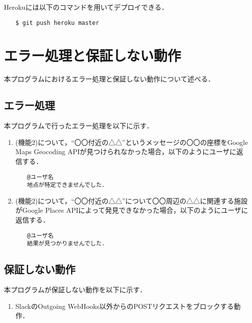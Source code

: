\documentclass[fleqn, 14pt]{extarticlej}
\begin{document}
Herokuには以下のコマンドを用いてデプロイできる．

\begin{verbatim}
　　$ git push heroku master
\end{verbatim}

\section{エラー処理と保証しない動作}
本プログラムにおけるエラー処理と保証しない動作について述べる．

\subsection{エラー処理}
本プログラムで行ったエラー処理を以下に示す．

\begin{enumerate}
\item (機能2)について，``〇〇付近の△△''というメッセージの〇〇の座標をGoogle Maps Geocoding APIが見つけられなかった場合，以下のようにユーザに返信する．
\begin{verbatim}
　　@ユーザ名
　　地点が特定できませんでした．
\end{verbatim}
\item (機能2)について，``〇〇付近の△△''について〇〇周辺の△△に関連する施設がGoogle Places APIによって発見できなかった場合，以下のようにユーザに返信する．
\begin{verbatim}
　　@ユーザ名
　　結果が見つかりませんでした．
\end{verbatim}
\end{enumerate}
\subsection{保証しない動作}
本プログラムが保証しない動作を以下に示す．

\begin{enumerate}
\item SlackのOutgoing WebHooks以外からのPOSTリクエストをブロックする動作．
\end{enumerate}



\end{document}
